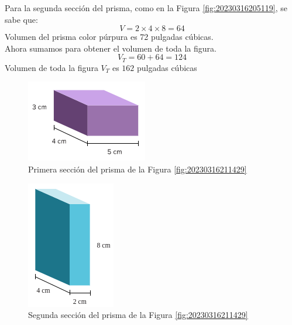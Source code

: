 \begin{solutionbox}{16cm}
\begin{minipage}[t]{.55\textwidth}
        Para la segunda sección del prisma, como en la Figura \ref{fig:20230316205119}, se sabe que:\\
        \[ V = 2\times 4\times 8=64\]
        Volumen del prisma color púrpura es 72 pulgadas cúbicas.\\
        Ahora sumamos para obtener el volumen de toda la figura.
        \[ V_T = 60+64=124\]
        Volumen de toda la figura $V_T$ es $162$ pulgadas cúbicas
    \end{minipage}
    \begin{multicols}{2}
        \begin{figure}[H]
            \centering
            \includegraphics[width=0.6\linewidth]{../images/20230316211742}
            \caption{Primera sección del prisma de la Figura \ref{fig:20230316211429}}
            \label{fig:20230316211742}
        \end{figure}
        \columnbreak
        \begin{figure}[H]
            \centering
            \includegraphics[width=0.3\linewidth]{../images/20230316211827}
            \caption{Segunda sección del prisma de la Figura \ref{fig:20230316211429}}
            \label{fig:20230316211827}
        \end{figure}
    \end{multicols}
\end{solutionbox}




